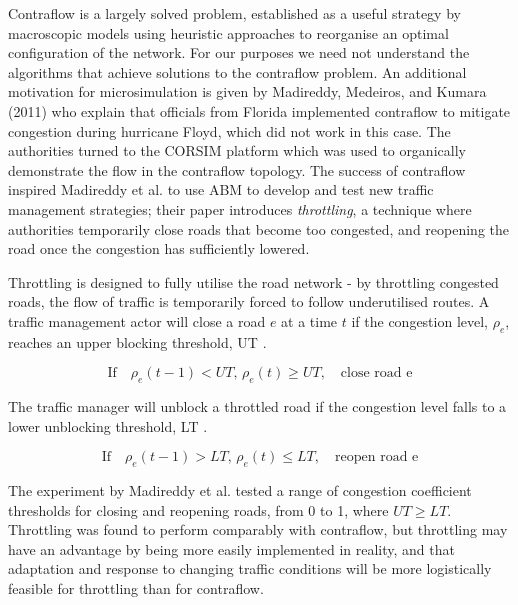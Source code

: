 Contraflow is a largely solved problem, established as a useful strategy by macroscopic models
using heuristic approaches to reorganise an optimal configuration of the network. \cite{SanghoKim2008ContraflowPlanning} For our purposes we need not understand the algorithms that achieve solutions to the contraflow problem.
An additional motivation for microsimulation is given by Madireddy, Medeiros, and Kumara (2011) who explain that officials from Florida implemented contraflow to mitigate congestion during hurricane Floyd, which did not work in this case. The authorities turned to the CORSIM platform which was used to organically demonstrate the flow in the contraflow topology. \cite{Madireddy2011AnManagement}
The success of contraflow inspired Madireddy et al. to use ABM to develop and test new traffic management strategies; their paper introduces \textit{throttling}, a technique where authorities temporarily close roads that become too congested, and reopening the road once the congestion has sufficiently lowered.

Throttling is designed to fully utilise the road network - by throttling congested roads, the flow of traffic is temporarily forced to follow underutilised routes. A traffic management actor will close a road $e$ at a time $t$ if the congestion level, $\rho_e$, reaches an upper blocking threshold, UT \cite{Madireddy2011AnManagement}.

\begin{equation}
    \text{If} \quad \rho_e(t-1) < UT,\, \rho_e(t)\geq UT, \quad \text{close road e} 
\end{equation}

The traffic manager will unblock a throttled road if the congestion level falls to a lower unblocking threshold, LT \cite{Madireddy2011AnManagement}.

\begin{equation}
    \text{If} \quad \rho_e(t-1) > LT,\, \rho_e(t)\leq LT, \quad \text{reopen road e} 
\end{equation}

The experiment by Madireddy et al. tested a range of congestion coefficient thresholds for closing and reopening roads, from 0 to 1, where $UT \geq LT$. Throttling was found to perform comparably with contraflow, but throttling may have an advantage by being more easily implemented in reality, and that adaptation and response to changing traffic conditions will be more logistically feasible for throttling than for contraflow.
